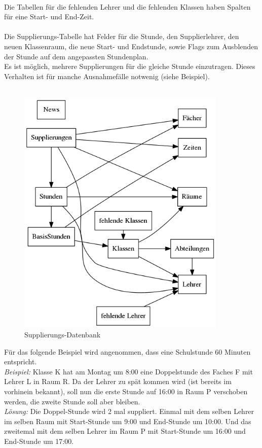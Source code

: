 \\
Die Tabellen für die fehlenden Lehrer und die fehlenden Klassen haben Spalten für eine Start- und End-Zeit.\\
\\
Die Supplierungs-Tabelle hat Felder für die Stunde, den Supplierlehrer, den neuen Klassenraum, die neue Start- und Endstunde, sowie Flags zum Ausblenden der Stunde auf dem angepassten Stundenplan.\\
Es ist möglich, mehrere Supplierungen für die gleiche Stunde einzutragen. Dieses Verhalten ist für manche Ausnahmefälle notwenig (siehe Beispiel).\\
\\

\begin{figure}[H]
\centering
\includegraphics[keepaspectratio=true, width=10cm]{images/dbSubstitudes.png}
\caption{Supplierungs-Datenbank}
\end{figure}

Für das folgende Beispiel wird angenommen, dass eine Schulstunde 60 Minuten entspricht.\\
\textit{Beispiel:} Klasse K hat am Montag um 8:00 eine Doppelstunde des Faches F mit Lehrer L in Raum R. Da der Lehrer zu spät kommen wird (ist bereits im vorhinein bekannt), soll nun die erste Stunde auf 16:00 in Raum P verschoben werden, die zweite Stunde soll aber bleiben.\\
\textit{Lösung:} Die Doppel-Stunde wird 2 mal suppliert. Einmal mit dem selben Lehrer im selben Raum mit Start-Stunde um 9:00 und End-Stunde um 10:00. Und das zweitemal mit dem selben Lehrer im Raum P mit Start-Stunde um 16:00 und End-Stunde um 17:00.

